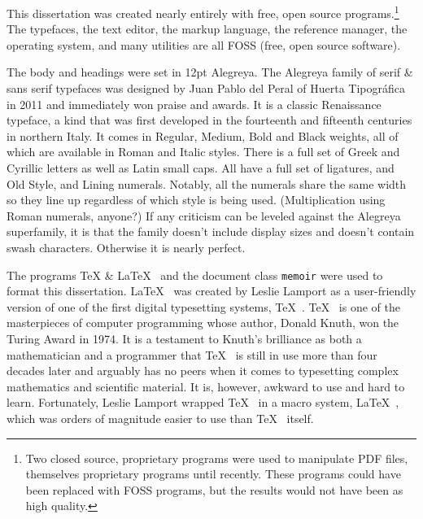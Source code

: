 This dissertation was created nearly entirely with free, open source programs.\footnote{Two closed source, proprietary programs were used to manipulate PDF files, themselves proprietary programs until recently. These programs could have been replaced with FOSS programs, but the results would not have been as high quality.} The typefaces, the text editor, the markup language, the reference manager, the operating system, and many utilities are all FOSS (free, open source software).
\begin{center}
  \textbf{\qquad{}\qquad{}\qquad{}\qquad{}}
\end{center}
The body and headings were set in 12pt Alegreya. The Alegreya family of serif \& sans serif typefaces was designed by Juan Pablo del Peral of Huerta Tipográfica in 2011 and immediately won praise and awards. It is a classic Renaissance typeface, a kind that was first developed in the fourteenth and fifteenth centuries in northern Italy. It comes in Regular, Medium, Bold and Black weights, all of which are available in Roman and Italic styles. There is a full set of Greek and Cyrillic letters as well as Latin small caps. All have a full set of ligatures, and Old Style, and Lining numerals. Notably, all the numerals share the same width so they line up regardless of which style is being used. (Multiplication using Roman numerals, anyone?) If any criticism can be leveled against the Alegreya superfamily, it is that the family doesn't include display sizes and doesn't contain swash characters. Otherwise it is nearly perfect.
\begin{center}
  \textbf{\quad\quad{}\quad\quad{}\quad\quad{}\quad\quad{}}
\end{center}
The programs \TeX{} \& \LaTeX{}  and the document class \texttt{memoir} were used to format this dissertation. \LaTeX  was created by Leslie Lamport as a user-friendly version of one of the first digital typesetting systems, \TeX . \TeX  is one of the masterpieces of computer programming whose author, Donald Knuth, won the Turing Award in 1974. It is a testament to Knuth's brilliance as both a mathematician and a programmer that \TeX  is still in use more than four decades later and arguably has no peers when it comes to typesetting complex mathematics and scientific material. It is, however, awkward to use and hard to learn. Fortunately, Leslie Lamport wrapped \TeX  in a macro system, \LaTeX , which was orders of magnitude easier to use than \TeX  itself.
